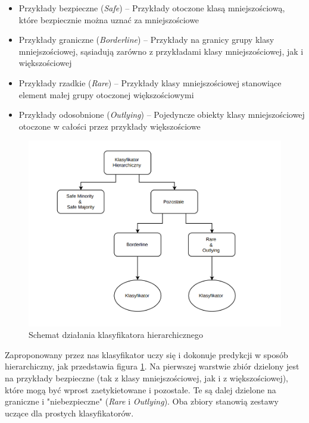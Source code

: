 \documentclass[polish,a4paper,twoside]{article}
\begin{document}
\begin{itemize}
\item Przykłady bezpieczne (\emph{Safe}) -- Przykłady otoczone klasą mniejszościową, które bezpiecznie można uznać za mniejszościowe
\item Przykłady graniczne (\emph{Borderline}) -- Przykłady na granicy grupy klasy mniejszościowej, sąsiadują zarówno z przykładami klasy mniejszościowej, jak i większościowej
\item Przykłady rzadkie (\emph{Rare}) -- Przykłady klasy mniejszościowej stanowiące element małej grupy otoczonej większościowymi
\item Przykłady odosobnione (\emph{Outlying}) -- Pojedyncze obiekty klasy mniejszościowej otoczone w całości przez przykłady większościowe
\end{itemize}

\begin{figure}
\centering
\includegraphics[width=\textwidth]{figures/hclassifier-diagram.png}
\caption{Schemat działania klasyfikatora hierarchicznego}
\label{fig:hclassifier-diagram}
\end{figure}

Zaproponowany przez nas klasyfikator uczy się i dokonuje predykcji w sposób hierarchiczny, jak przedstawia figura \ref{fig:hclassifier-diagram}. Na pierwszej warstwie zbiór dzielony jest na przykłady bezpieczne (tak z klasy mniejszościowej, jak i z większościowej), które mogą być wprost zaetykietowane i pozostałe. Te są dalej dzielone na graniczne i "niebezpieczne" (\emph{Rare} i \emph{Outlying}). Oba zbiory stanowią zestawy uczące dla prostych klasyfikatorów. \\
\end{document}
